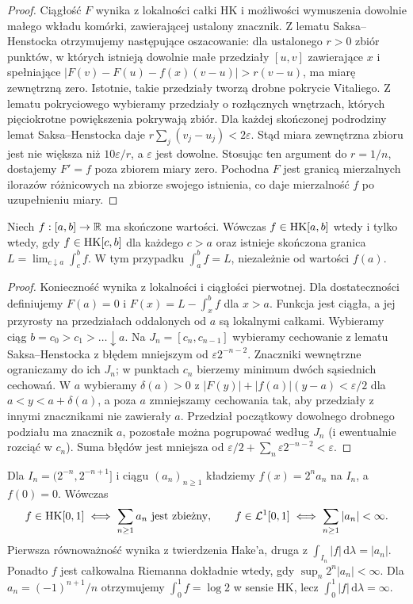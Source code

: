 \begin{proof}
Ciągłość $F$ wynika z lokalności całki HK i możliwości wymuszenia dowolnie małego wkładu komórki, zawierającej ustalony znacznik. Z lematu Saksa--Henstocka otrzymujemy następujące oszacowanie: dla ustalonego $r>0$ zbiór punktów, w których istnieją dowolnie małe przedziały $[u,v]$ zawierające $x$ i spełniające $|F(v)-F(u)-f(x)(v-u)|>r(v-u)$, ma miarę zewnętrzną zero. Istotnie, takie przedziały tworzą drobne pokrycie Vitaliego. Z lematu pokryciowego wybieramy przedziały o rozłącznych wnętrzach, których pięciokrotne powiększenia pokrywają zbiór. Dla każdej skończonej podrodziny lemat Saksa--Henstocka daje $r\sum_j(v_j-u_j)<2\varepsilon$. Stąd miara zewnętrzna zbioru jest nie większa niż $10\varepsilon/r$, a $\varepsilon$ jest dowolne. Stosując ten argument do $r=1/n$, dostajemy $F'=f$ poza zbiorem miary zero. Pochodna $F$ jest granicą mierzalnych ilorazów różnicowych na zbiorze swojego istnienia, co daje mierzalność $f$ po uzupełnieniu miary.
\end{proof}
\begin{twierdzenie}
Niech $f:[a,b]\to\mathbb R$ ma skończone wartości. Wówczas $f\in\mathrm{HK}[a,b]$ wtedy i tylko wtedy, gdy $f\in\mathrm{HK}[c,b]$ dla każdego $c>a$ oraz istnieje skończona granica $L=\lim_{c\downarrow a}\int_c^b f$. W tym przypadku $\int_a^b f=L$, niezależnie od wartości $f(a)$.
\end{twierdzenie}
\begin{proof}
Konieczność wynika z lokalności i ciągłości pierwotnej. Dla dostateczności definiujemy $F(a)=0$ i $F(x)=L-\int_x^b f$ dla $x>a$. Funkcja jest ciągła, a jej przyrosty na przedziałach oddalonych od $a$ są lokalnymi całkami. Wybieramy ciąg $b=c_0>c_1>\dots\downarrow a$. Na $J_n=[c_n,c_{n-1}]$ wybieramy cechowanie z lematu Saksa--Henstocka z błędem mniejszym od $\varepsilon2^{-n-2}$. Znaczniki wewnętrzne ograniczamy do ich $J_n$; w punktach $c_n$ bierzemy minimum dwóch sąsiednich cechowań. W $a$ wybieramy $\delta(a)>0$ z $|F(y)|+|f(a)|(y-a)<\varepsilon/2$ dla $a<y<a+\delta(a)$, a poza $a$ zmniejszamy cechowania tak, aby przedziały z innymi znacznikami nie zawierały $a$. Przedział początkowy dowolnego drobnego podziału ma znacznik $a$, pozostałe można pogrupować według $J_n$ (i ewentualnie rozciąć w $c_n$). Suma błędów jest mniejsza od $\varepsilon/2+\sum_n\varepsilon2^{-n-2}<\varepsilon$.
\end{proof}
\begin{przyklad}
Dla $I_n=(2^{-n},2^{-n+1}]$ i ciągu $(a_n)_{n\ge1}$ kładziemy $f(x)=2^n a_n$ na $I_n$, a $f(0)=0$. Wówczas
\[
f\in\HK[0,1]\iff\sum_{n\ge1}a_n\ \text{jest zbieżny},\qquad
f\in\mathcal L^1[0,1]\iff\sum_{n\ge1}|a_n|<\infty.
\]
Pierwsza równoważność wynika z twierdzenia Hake'a, druga z $\int_{I_n}|f|\,\mathrm d\lambda=|a_n|$. Ponadto $f$ jest całkowalna Riemanna dokładnie wtedy, gdy $\sup_n2^n|a_n|<\infty$. Dla $a_n=(-1)^{n+1}/n$ otrzymujemy $\int_0^1f=\log2$ w sensie HK, lecz $\int_0^1|f|\,\mathrm d\lambda=\infty$.
\end{przyklad}

